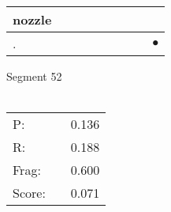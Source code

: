 \documentclass[landscape]{article}
\newcommand{\ssp}{\hspace{2pt}}
\newcommand{\mex}{\cellcolor{g}$\bullet$}
\begin{document}
\begin{tabular}{|l|p{10pt}|p{10pt}|p{10pt}|p{10pt}|p{10pt}|p{10pt}|p{10pt}|p{10pt}|}
\hline
\ssp nozzle \ssp&\hspace{2pt}&\hspace{2pt}&\hspace{2pt}&\hspace{2pt}&\hspace{2pt}&\hspace{2pt}&\hspace{2pt}&\hspace{2pt}\\
\hline
\ssp \cellcolor{ref7}. \ssp&\hspace{2pt}&\hspace{2pt}&\hspace{2pt}&\hspace{2pt}&\hspace{2pt}&\hspace{2pt}&\hspace{2pt}&\hspace{2pt}\mex\\
\hline
\end{tabular}

\vspace{6pt}
\noindent Segment 52\\\\
\noindent\begin{tabular}{lm{12pt}r}
\hline
P:&&0.136\\
R:&&0.188\\
Frag:&&0.600\\
Score:&&0.071\\
\end{tabular}

\newpage
\end{document}
